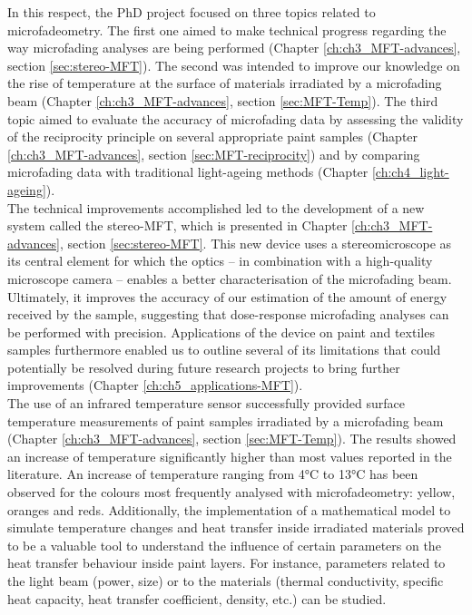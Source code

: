 In this respect, the PhD project focused on three topics related to microfadeometry. The first one aimed to make technical progress regarding the way microfading analyses are being performed (Chapter \ref{ch:ch3_MFT-advances}, section \ref{sec:stereo-MFT}). The second was intended to improve our knowledge on the rise of temperature at the surface of materials irradiated by a microfading beam (Chapter \ref{ch:ch3_MFT-advances}, section \ref{sec:MFT-Temp}). The third topic aimed to evaluate the accuracy of microfading data by assessing the validity of the reciprocity principle on several appropriate paint samples (Chapter \ref{ch:ch3_MFT-advances}, section \ref{sec:MFT-reciprocity}) and by comparing microfading data with traditional light-ageing methods (Chapter \ref{ch:ch4_light-ageing}). \\

The technical improvements accomplished led to the development of a new system called the stereo-MFT, which is presented in Chapter \ref{ch:ch3_MFT-advances}, section \ref{sec:stereo-MFT}. This new device uses a stereomicroscope as its central element for which the optics – in combination with a high-quality microscope camera – enables a better characterisation of the microfading beam. Ultimately, it improves the accuracy of our estimation of the amount of energy received by the sample, suggesting that dose-response microfading analyses can be performed with precision. Applications of the device on paint and textiles samples furthermore enabled us to outline several of its limitations that could potentially be resolved during future research projects to bring further improvements (Chapter \ref{ch:ch5_applications-MFT}). \\

The use of an infrared temperature sensor successfully provided surface temperature measurements of paint samples irradiated by a microfading beam (Chapter \ref{ch:ch3_MFT-advances}, section \ref{sec:MFT-Temp}). The results showed an increase of temperature significantly higher than most values reported in the literature. An increase of temperature ranging from 4\unit{\degreeCelsius} to 13\unit{\degreeCelsius} has been observed for the colours most frequently analysed with microfadeometry: yellow, oranges and reds. Additionally, the implementation of a mathematical model to simulate temperature changes and heat transfer inside irradiated materials proved to be a valuable tool to understand the influence of certain parameters on the heat transfer behaviour inside paint layers. For instance, parameters related to the light beam (power, size) or to the materials (thermal conductivity, specific heat capacity, heat transfer coefficient, density, etc.) can be studied. \\ 

